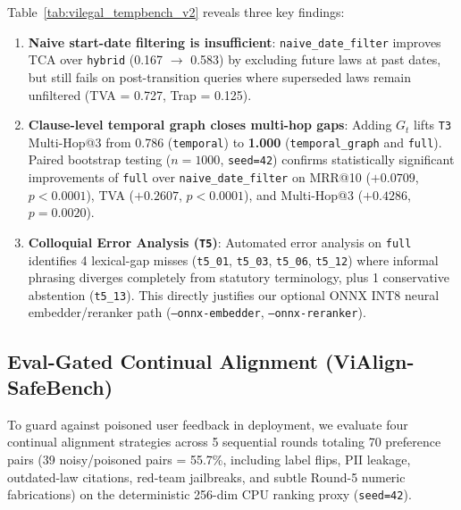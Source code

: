 \documentclass[11pt,a4paper]{article}
\begin{document}
Table~\ref{tab:vilegal_tempbench_v2} reveals three key findings:
\begin{enumerate}
  \item \textbf{Naive start-date filtering is insufficient}: \texttt{naive\_date\_filter} improves TCA over \texttt{hybrid} (0.167 $\to$ 0.583) by excluding future laws at past dates, but still fails on post-transition queries where superseded laws remain unfiltered (TVA = 0.727, Trap = 0.125).
  \item \textbf{Clause-level temporal graph closes multi-hop gaps}: Adding $G_t$ lifts \texttt{T3} Multi-Hop@3 from 0.786 (\texttt{temporal}) to \textbf{1.000} (\texttt{temporal\_graph} and \texttt{full}). Paired bootstrap testing ($n=1000$, \texttt{seed=42}) confirms statistically significant improvements of \texttt{full} over \texttt{naive\_date\_filter} on MRR@10 ($+0.0709$, $p < 0.0001$), TVA ($+0.2607$, $p < 0.0001$), and Multi-Hop@3 ($+0.4286$, $p = 0.0020$).
  \item \textbf{Colloquial Error Analysis (\texttt{T5})}: Automated error analysis on \texttt{full} identifies 4 lexical-gap misses (\texttt{t5\_01}, \texttt{t5\_03}, \texttt{t5\_06}, \texttt{t5\_12}) where informal phrasing diverges completely from statutory terminology, plus 1 conservative abstention (\texttt{t5\_13}). This directly justifies our optional ONNX INT8 neural embedder/reranker path (\texttt{--onnx-embedder}, \texttt{--onnx-reranker}).
\end{enumerate}

\subsection{Eval-Gated Continual Alignment (ViAlign-SafeBench)}
To guard against poisoned user feedback in deployment, we evaluate four continual alignment strategies across 5 sequential rounds totaling 70 preference pairs (39 noisy/poisoned pairs = 55.7\%, including label flips, PII leakage, outdated-law citations, red-team jailbreaks, and subtle Round-5 numeric fabrications) on the deterministic 256-dim CPU ranking proxy (\texttt{seed=42}).
\end{document}
